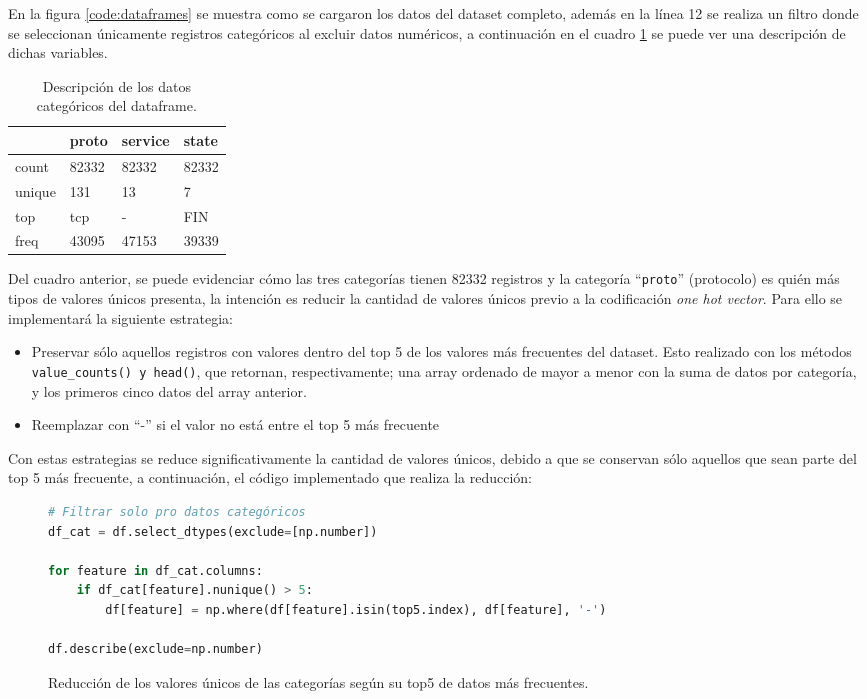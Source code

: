 \documentclass{article}
\begin{document}
En la figura \ref{code:dataframes} se muestra como se cargaron los datos del dataset completo, además en la línea 12 se realiza un filtro donde se seleccionan únicamente registros categóricos al excluir datos numéricos, a continuación en el cuadro \ref{tab:df_cat_describe} se puede ver una descripción de dichas variables.

\begin{table}[htbp]
    \centering
    \begin{tabular}{llll}
    \toprule
     & proto & service & state \\
    \midrule
    count & 82332 & 82332 & 82332 \\
    unique & 131 & 13 & 7 \\
    top & tcp & - & FIN \\
    freq & 43095 & 47153 & 39339 \\
    \bottomrule
    \end{tabular}
    \caption{Descripción de los datos categóricos del dataframe.}
    \label{tab:df_cat_describe}
\end{table}

Del cuadro anterior, se puede evidenciar cómo las tres categorías tienen 82332 registros y la categoría ``\texttt{proto}'' (protocolo) es quién más tipos de valores únicos presenta, la intención es reducir la cantidad de valores únicos previo a la codificación \textit{one hot vector}. Para ello se implementará la siguiente estrategia:

\begin{itemize}
    \item Preservar sólo aquellos registros con valores dentro del top 5 de los valores más frecuentes del dataset. Esto realizado con los métodos \texttt{value\_counts() y head()}, que retornan, respectivamente; una array ordenado de mayor a menor con la suma de datos por categoría, y los primeros cinco datos del array anterior.

    \item Reemplazar con ``-'' si el valor no está entre el top 5 más frecuente
\end{itemize}

\newpage
Con estas estrategias se reduce significativamente la cantidad de valores únicos, debido a que se conservan sólo aquellos que sean parte del top 5 más frecuente, a continuación, el código implementado que realiza la reducción:

\begin{figure}[htbp]
\begin{lstlisting}[language=Python, texcl=True]
# Filtrar solo pro datos categóricos
df_cat = df.select_dtypes(exclude=[np.number])

for feature in df_cat.columns:
    if df_cat[feature].nunique() > 5:
        df[feature] = np.where(df[feature].isin(top5.index), df[feature], '-')

df.describe(exclude=np.number)
\end{lstlisting}
\caption{Reducción de los valores únicos de las categorías según su top5 de datos más frecuentes.}
\label{code:reducted_df}
\end{figure}
\end{document}
